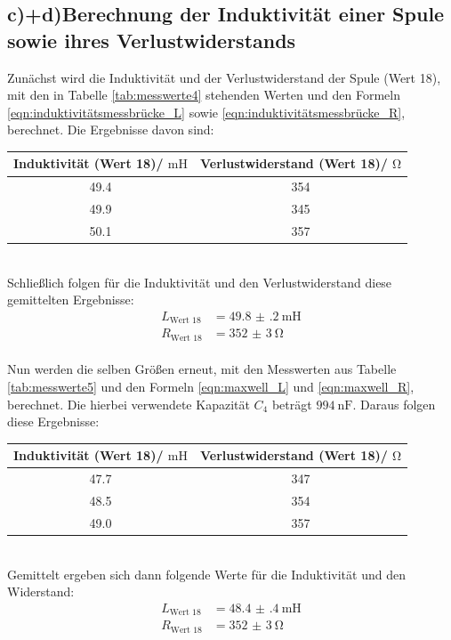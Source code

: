 \documentclass[
  bibliography=totoc,     %
  captions=tableheading,  %
  titlepage=firstiscover, %
]{scrartcl}
\begin{document}
\subsection{c)+d)Berechnung der Induktivität einer Spule sowie ihres Verlustwiderstands}
Zunächst wird die Induktivität und der Verlustwiderstand der Spule (Wert 18), mit den
in Tabelle \ref{tab:messwerte4} stehenden Werten und den Formeln \eqref{eqn:induktivitätsmessbrücke_L}
sowie \eqref{eqn:induktivitätsmessbrücke_R}, berechnet. Die Ergebnisse davon sind:
\begin{table}
  \centering
  \label{tab:ergebnisse3}
  \begin{tabular}{c c}
    \toprule
    Induktivität (Wert 18)/ $\si{\milli\henry}$ & Verlustwiderstand (Wert 18)/ $\si{\ohm}$\\
    \midrule
    \num{49.4} & \num{354}\\
    \num{49.9} & \num{345}\\
    \num{50.1} & \num{357}\\
    \bottomrule
  \end{tabular}
\end{table}
\\
Schließlich folgen für die Induktivität und den Verlustwiderstand diese gemittelten
Ergebnisse:
\begin{align}
  L_\text{Wert 18} &= \SI{49.8(2)}{\milli\henry}\\
  R_\text{Wert 18} &= \SI{352(3)}{\ohm}
\end{align}
\\
Nun werden die selben Größen erneut, mit den Messwerten aus Tabelle \ref{tab:messwerte5}
und den Formeln \eqref{eqn:maxwell_L} und \eqref{eqn:maxwell_R}, berechnet.
Die hierbei verwendete Kapazität $C_4$ beträgt $\SI{994}{\nano\farad}$.
\newpage
Daraus folgen diese Ergebnisse:
\begin{table}
  \centering
  \label{tab:ergebnisse4}
  \begin{tabular}{c c}
    \toprule
    Induktivität (Wert 18)/ $\si{\milli\henry}$ & Verlustwiderstand (Wert 18)/ $\si{\ohm}$\\
    \midrule
    \num{47.7} & \num{347}\\
    \num{48.5} & \num{354}\\
    \num{49.0} & \num{357}\\
    \bottomrule
  \end{tabular}
\end{table}
\\
Gemittelt ergeben sich dann folgende Werte für die Induktivität und den Widerstand:
\begin{align}
  L_\text{Wert 18} &= \SI{48.4(4)}{\milli\henry}\\
  R_\text{Wert 18} &= \SI{352(3)}{\ohm}
\end{align}
\end{document}
